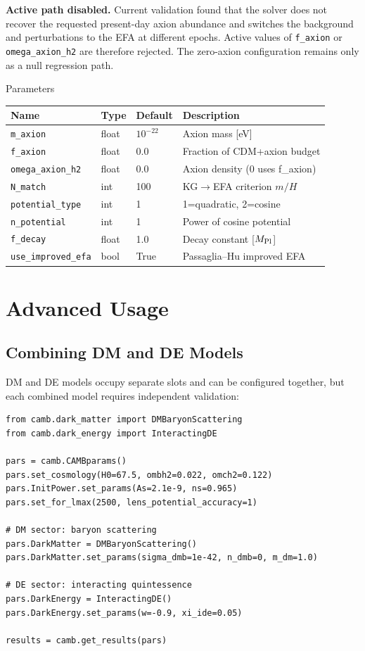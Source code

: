 \documentclass[11pt,a4paper]{article}
\begin{document}
\begin{notebox}
\textbf{Active path disabled.} Current validation found that the solver does not
recover the requested present-day axion abundance and switches the background
and perturbations to the EFA at different epochs. Active values of
\texttt{f\_axion} or \texttt{omega\_axion\_h2} are therefore rejected. The
zero-axion configuration remains only as a null regression path.
\end{notebox}

\begin{parambox}{Parameters}
\begin{tabular}{llll}
\toprule
Name & Type & Default & Description \\
\midrule
\texttt{m\_axion} & float & $10^{-22}$ & Axion mass [eV] \\
\texttt{f\_axion} & float & 0.0 & Fraction of CDM+axion budget \\
\texttt{omega\_axion\_h2} & float & 0.0 & Axion density (0 uses f\_axion) \\
\texttt{N\_match} & int & 100 & KG$\to$EFA criterion $m/H$ \\
\texttt{potential\_type} & int & 1 & 1=quadratic, 2=cosine \\
\texttt{n\_potential} & int & 1 & Power of cosine potential \\
\texttt{f\_decay} & float & 1.0 & Decay constant [$M_{\rm Pl}$] \\
\texttt{use\_improved\_efa} & bool & True & Passaglia--Hu improved EFA \\
\bottomrule
\end{tabular}
\end{parambox}

\newpage
\section{Advanced Usage}

\subsection{Combining DM and DE Models}

DM and DE models occupy separate slots and can be configured together, but each
combined model requires independent validation:

\begin{lstlisting}
from camb.dark_matter import DMBaryonScattering
from camb.dark_energy import InteractingDE

pars = camb.CAMBparams()
pars.set_cosmology(H0=67.5, ombh2=0.022, omch2=0.122)
pars.InitPower.set_params(As=2.1e-9, ns=0.965)
pars.set_for_lmax(2500, lens_potential_accuracy=1)

# DM sector: baryon scattering
pars.DarkMatter = DMBaryonScattering()
pars.DarkMatter.set_params(sigma_dmb=1e-42, n_dmb=0, m_dm=1.0)

# DE sector: interacting quintessence
pars.DarkEnergy = InteractingDE()
pars.DarkEnergy.set_params(w=-0.9, xi_ide=0.05)

results = camb.get_results(pars)
\end{lstlisting}
\end{document}
